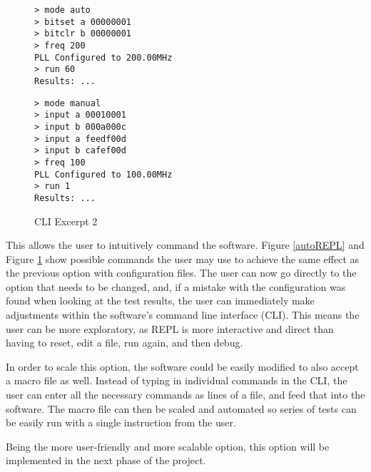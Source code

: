 \begin{figure}[H]
  \centering
  \begin{minipage}[b]{.5\linewidth}
  \begin{verbatim}
> mode auto
> bitset a 00000001
> bitclr b 00000001
> freq 200
PLL Configured to 200.00MHz
> run 60
Results: ...
  \end{verbatim}
  \caption{CLI Excerpt 1}
  \label{autoREPL}
  \end{minipage}%
  \begin{minipage}[b]{.5\linewidth}
  \begin{verbatim}
> mode manual
> input a 00010001
> input b 000a000c
> input a feedf00d
> input b cafef00d
> freq 100
PLL Configured to 100.00MHz
> run 1
Results: ...
  \end{verbatim}
  \caption{CLI Excerpt 2}
  \label{manREPL}
  \end{minipage}
\end{figure}

This allows the user to intuitively command the software.
Figure \ref{autoREPL} and Figure \ref{manREPL} show possible commands the user may use to achieve the same effect as the previous option with configuration files.
The user can now go directly to the option that needs to be changed, and, if a mistake with the configuration was found when looking at the test results, the user can immediately make adjustments within the software's command line interface (CLI).
This means the user can be more exploratory, as REPL is more interactive and direct than having to reset, edit a file, run again, and then debug.

In order to scale this option, the software could be easily modified to also accept a macro file as well.
Instead of typing in individual commands in the CLI, the user can enter all the necessary commands as lines of a file, and feed that into the software.
The macro file can then be scaled and automated so series of tests can be easily run with a single instruction from the user.

Being the more user-friendly and more scalable option, this option will be implemented in the next phase of the project.
